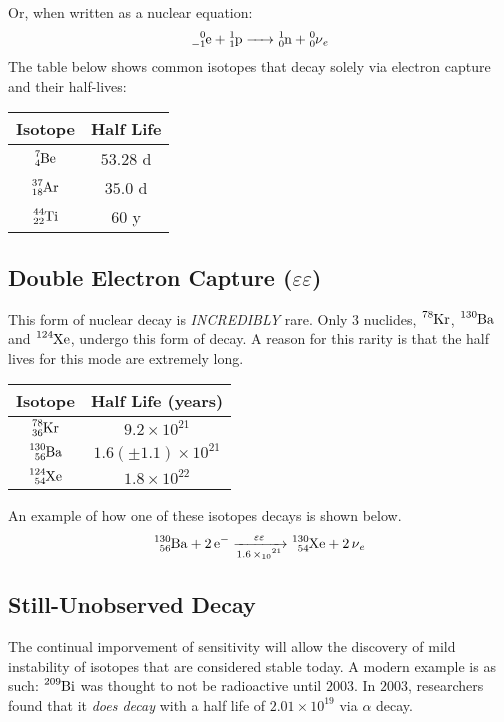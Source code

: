 \documentclass{article}
\begin{document}
\begin{multicols*}{2}
    Or, when written as a nuclear equation:
    \[
      \ce{^{0}_{-1}e + ^{1}_{1}p -> ^{1}_{0}n + ^{0}_{0}\nu_{e}}
    \]
    The table below shows common isotopes that decay solely via electron capture
    and their half-lives: \\

    \begin{tabular}{|c|c|}
      \hline
      \textbf{Isotope} & \textbf{Half Life} \\
      \hline
      $\ce{^{7}_{4}Be}$ & $53.28$ d \\
      $\ce{^{37}_{18}Ar}$ & $35.0$ d \\
      $\ce{^{44}_{22}Ti}$ & $60$ y \\
      \hline
    \end{tabular}

    \subsection{Double Electron Capture ($\varepsilon\varepsilon$)}
    This form of nuclear decay is \textit{INCREDIBLY} rare. Only 3 nuclides,
    $\ce{^{78}Kr}$, $\ce{^{130}Ba}$ and $\ce{^{124}Xe}$, undergo this form of decay.
    A reason for this rarity is that the half lives for this mode are extremely
    long.\\

    \begin{tabular}{|c|c|}
      \hline
      \textbf{Isotope} & \textbf{Half Life (years)} \\
      \hline
      $\ce{^{78}_{36}Kr}$ & $9.2 \times 10^{21}$ \\
      $\ce{^{130}_{56}Ba}$ & $1.6(\pm{1.1})\times 10^{21}$ \\
      $\ce{^{124}_{54}Xe}$ & $1.8 \times 10^{22}$ \\
      \hline
    \end{tabular}

    An example of how one of these isotopes decays is shown below.
    \[
      \ce{^{130}_{56}Ba + 2 e- ->[\varepsilon\varepsilon][1.6 \times 10^{21}] ^{130}_{54}Xe + 2 \nu_{e}}
    \]

    \subsection{Still-Unobserved Decay}
    The continual imporvement of sensitivity will allow the discovery of mild
    instability of isotopes that are considered stable today. A modern example is as
    such: $\ce{^{209}Bi}$ was thought to not be radioactive until $2003$. In $2003$,
    researchers found that it \textit{does decay} with a half life of $2.01 \times 10^{19}$
    via $\alpha$ decay.\\


\end{multicols*}
\end{document}
